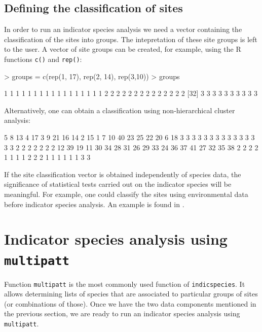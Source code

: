 \documentclass[11pt,a4paper]{article}
\begin{document}
\subsection{Defining the classification of sites}
In order to run an indicator species analysis we need a vector containing the classification of the sites into groups. The intepretation of these site groups is left to the user. A vector of site groups can be created, for example, using the R functions \texttt{c()} and \texttt{rep()}:
\begin{Schunk}
\begin{Sinput}
> groups = c(rep(1, 17), rep(2, 14), rep(3,10))
> groups
\end{Sinput}
\begin{Soutput}
 [1] 1 1 1 1 1 1 1 1 1 1 1 1 1 1 1 1 1 2 2 2 2 2 2 2 2 2 2 2 2 2 2
[32] 3 3 3 3 3 3 3 3 3 3
\end{Soutput}
\end{Schunk}
Alternatively, one can obtain a classification using non-hierarchical cluster analysis:
\begin{Schunk}
\begin{Soutput}
 5  8 13  4 17  3  9 21 16 14  2 15  1  7 10 40 23 25 22 20  6 18 
 3  3  3  3  3  3  3  3  3  3  3  3  3  3  3  2  2  2  2  2  2  2 
12 39 19 11 30 34 28 31 26 29 33 24 36 37 41 27 32 35 38 
 2  2  2  2  1  1  1  1  2  2  2  1  1  1  1  1  1  3  3 
\end{Soutput}
\end{Schunk}

If the site classification vector is obtained independently of species data, the significance of statistical tests carried out on the indicator species will be meaningful. For example, one could classify the sites using environmental data before indicator species analysis. An example is found in \citet{Borcard2011}.

\section{Indicator species analysis using \texttt{multipatt}}
Function \texttt{multipatt} is the most commonly used function of \texttt{indicspecies}. It allows determining lists of species that are associated to particular groups of sites (or combinations of those). Once we have the two data components mentioned in the previous section, we are ready to run an indicator species analysis using \texttt{multipatt}.
\end{document}
